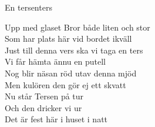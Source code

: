 \begin{song}{En ters}{enters}
\begin{vers}
Upp med glaset Bror både liten och stor\\
Som har plats här vid bordet ikväll\\
Just till denna vers ska vi taga en ters\\
Vi får hämta ännu en putell\\
Nog blir näsan röd utav denna mjöd\\
Men kulören den gör ej ett skvatt\\
Nu står Tersen på tur\\
Och den dricker vi ur\\
Det är fest här i huset i natt\\
\end{vers}
\end{song}
